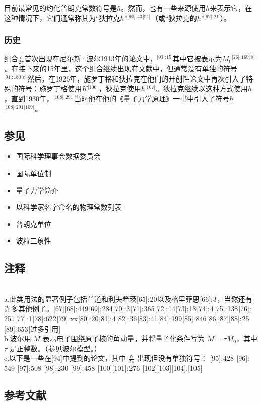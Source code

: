 目前最常见的约化普朗克常数符号是\( \hbar \)。然而，也有一些来源使用\( h \)来表示它，在这种情况下，它们通常称其为“狄拉克\( h \)”\(^\text{[90]: 43 [91] }\)（或“狄拉克的\( h \)”\(^\text{[92]: 21 }\) ）。
\subsubsection{历史}  
组合\(\frac{h}{2\pi}\)首次出现在尼尔斯·波尔1913年的论文中，\(^\text{[93]: 15 }\) 其中它被表示为\(M_0\)\(^\text{[26]: 169 [b] }\) 。在接下来的15年里，这个组合继续出现在文献中，但通常没有单独的符号\(^\text{[94]: 180 [c] }\)然后，在1926年，施罗丁格和狄拉克在他们的开创性论文中再次引入了特殊的符号：施罗丁格使用\(K\)\(^\text{[106] }\)，狄拉克使用\( h \)\(^\text{[107] }\)。狄拉克继续以这种方式使用\(h\)，直到1930年，\(^\text{[108]: 291 }\) 当时他在他的《量子力学原理》一书中引入了符号\(\hbar\)\(^\text{[108]: 291 [109] }\)。
\subsection{参见}  
\begin{itemize}
\item 国际科学理事会数据委员会  
\item 国际单位制  
\item 量子力学简介  
\item 以科学家名字命名的物理常数列表  
\item 普朗克单位  
\item 波粒二象性
\end{itemize}  
\subsection{注释}\\  
a.此类用法的显著例子包括兰道和利夫希茨[65]: 20 以及格里菲思[66]: 3 ，当然还有许多其他例子。[67][68]: 449 [69]: 284 [70]: 3 [71]: 365 [72]: 14 [73]: 18 [74]: 4 [75]: 138 [76]: 251 [77]: 1 [78]: 622 [79]: xx [80]: 20 [81]: 4 [82]: 36 [83]: 41 [84]: 199 [85]: 846 [86][87][88]: 25 [89]: 653 [过多引用] \\ 
b.波尔用 \( M \) 表示电子围绕原子核的角动量，并将量子化条件写为 \( M = \tau M_0 \)，其中 \( \tau \) 是正整数。（参见波尔模型。）\\  
c.以下是一些在[94]中提到的论文，其中 \( \frac{h}{2\pi} \) 出现但没有单独符号： [95]: 428  [96]: 549  [97]: 508  [98]: 230  [99]: 458  [100][101]: 276  [102][103][104].[105]\\
\subsection{参考文献}  
